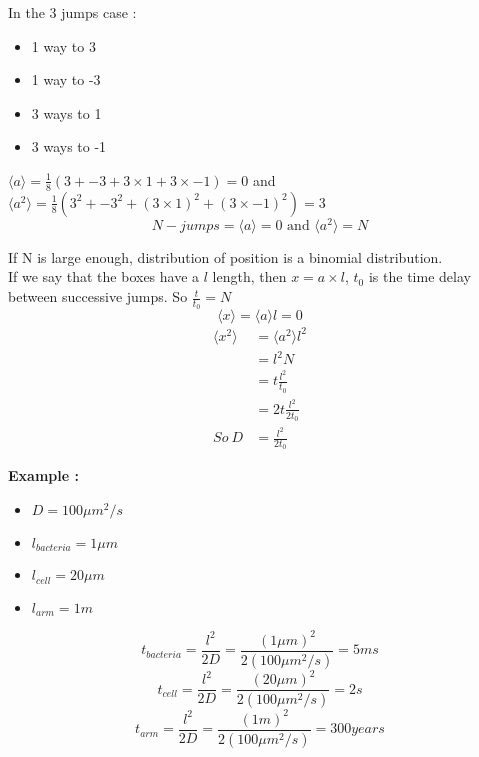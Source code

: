 \documentclass[10pt,a4paper]{article}
\begin{document}
In the 3 jumps case :
\begin{itemize}
    \item 1 way to 3
    \item 1 way to -3
    \item 3 ways to 1
    \item 3 ways to -1
\end{itemize}
$\langle a \rangle = \frac{1}{8}( 3 + {-3} + 3 \times 1 + 3\times {-1} ) = 0$ and $\langle a^2 \rangle = \frac{1}{8}( 3^2 + {-3}^2 + (3 \times 1)^2 + (3\times {-1})^2 )=3$\\

\[ N-jumps = \langle a \rangle = 0\text{ and }\langle a^2 \rangle = N\]

If N is large enough, distribution of position is a binomial distribution.\\

If we say that the boxes have a $l$ length, then $x = a \times l$, $t_0$ is the time delay between successive jumps. So $\frac{t}
{t_0} = N$
\[ \langle x \rangle = \langle a \rangle l = 0 \]
\begin{align*}
    \langle x^2 \rangle &= \langle a^2 \rangle l^2 \\
    &= l^2 N \\
    &= t\frac{l^2}{t_0}\\
    &= 2t\frac{l^2}{2t_0}\\
    So ~ D &= \frac{l^2}{2t_0}
\end{align*}

\textbf{Example :} \\
\begin{itemize}
    \item $D = 100\mu m ^2 /s$
    \item $l_{bacteria} = 1 \mu m$
    \item $l_{cell} = 20 \mu m$
    \item $l_{arm} = 1m$
\end{itemize}
\[ t_{bacteria} = \frac{l^2}{2D} = \frac{(1 \mu m)^2}{2(100\mu m ^2 /s)} = 5 ms\]
\[ t_{cell} = \frac{l^2}{2D} = \frac{(20 \mu m)^2}{2(100\mu m ^2 /s)}= 2s \]
\[ t_{arm} = \frac{l^2}{2D} = \frac{(1m)^2}{2(100\mu m ^2 /s)}= 300 years \]
\end{document}
